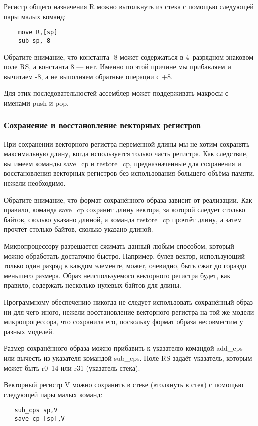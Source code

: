\documentclass[forwardcom.tex]{subfiles}
\begin{document}
Регистр общего назначения R можно вытолкнуть из стека с помощью следующей пары малых команд:
\begin{verbatim}
    move R,[sp] 
    sub sp,-8
\end{verbatim}
Обратите внимание, что константа -8 может содержаться в 4--разрядном знаковом поле RS, а константа 8 --- нет. Именно по этой причине мы прибавляем и вычитаем -8, а не выполняем обратные операции с +8.

Для этих последовательностей ассемблер может поддерживать макросы с именами push и pop.

\subsubsection{Сохранение и восстановление векторных регистров} \label{saveRestoreVectorRegisters}
При сохранении векторного регистра переменной длины мы не хотим сохранять максимальную длину, когда используется только часть регистра. Как следствие, вы имеем команды save\_cp и restore\_cp, предназначенные для сохранения и восстановления векторных регистров без использования большего объёма памяти, нежели необходимо.

Обратите внимание, что формат сохранённого образа зависит от реализации. Как правило, команда save\_cp сохранит длину вектора, за которой  следует столько байтов, сколько указано длиной, а команда restore\_cp прочтёт длину, а затем прочтёт столько байтов, сколько указано длиной.

Микропроцессору разрешается сжимать данный любым способом, который можно обработать достаточно быстро. Например, булев вектор, использующий только один разряд в каждом элементе, может, очевидно, быть сжат до гораздо меньшего размера. Образ неиспользуемого векторного регистра будет, как правило, содержать несколько нулевых байтов для длины.

Программному обеспечению никогда не следует использовать сохранённый образ ни для чего иного, нежели восстановление векторного регистра на той же модели микропроцессора, что сохранила его, поскольку формат образа несовместим у разных моделей.

Размер сохранённого образа можно прибавить к указателю командой add\_cps или вычесть из указателя командой sub\_cps. Поле RS задаёт указатель, которым может быть r0--14 или r31 (указатель стека).

Векторный регистр V можно сохранить в стеке (втолкнуть в стек) с помощью следующей пары малых команд: 
\begin{verbatim}
   sub_cps sp,V
   save_cp [sp],V
\end{verbatim}
\end{document}
